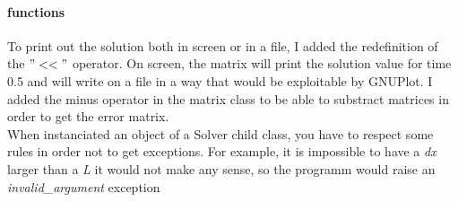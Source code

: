 \documentclass[12pt, a4paper]{report}
\begin{document}
\paragraph{functions}
To print out the solution both in screen or in a file, I added the redefinition of the $"<<"$ operator. On screen, the matrix will print the solution value for time 0.5 and will write on a file in a way that would be exploitable by GNUPlot.
I added the minus operator in the matrix class to be able to substract matrices in order to get the error matrix. \\When instanciated an object of a Solver child class, you have to respect some rules in order not to get exceptions. For example, it is impossible to have a \textit{dx} larger than a \textit{L} it would not make any sense, so the programm would raise an \textit{invalid\_argument} exception
\end{document}

